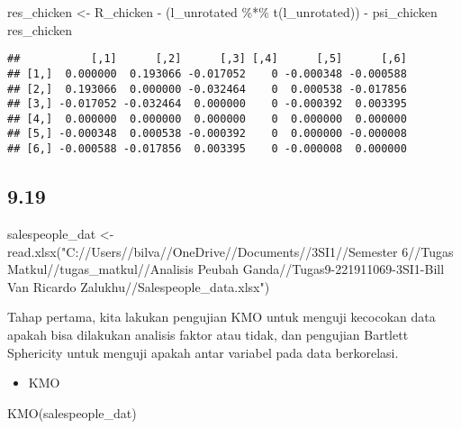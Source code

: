 \documentclass[
]{article}
\newenvironment{Shaded}{\begin{snugshade}}{\end{snugshade}}
\newcommand{\FunctionTok}[1]{\textcolor[rgb]{0.00,0.00,0.00}{#1}}
\newcommand{\NormalTok}[1]{#1}
\newcommand{\OtherTok}[1]{\textcolor[rgb]{0.56,0.35,0.01}{#1}}
\newcommand{\SpecialCharTok}[1]{\textcolor[rgb]{0.00,0.00,0.00}{#1}}
\newcommand{\StringTok}[1]{\textcolor[rgb]{0.31,0.60,0.02}{#1}}
\providecommand{\tightlist}{%
  \setlength{\itemsep}{0pt}\setlength{\parskip}{0pt}}
\begin{document}
\begin{Shaded}
\begin{Highlighting}[]
\NormalTok{res\_chicken }\OtherTok{\textless{}{-}}\NormalTok{ R\_chicken }\SpecialCharTok{{-}}\NormalTok{ (l\_unrotated }\SpecialCharTok{\%*\%} \FunctionTok{t}\NormalTok{(l\_unrotated)) }\SpecialCharTok{{-}}\NormalTok{ psi\_chicken}
\NormalTok{res\_chicken}
\end{Highlighting}
\end{Shaded}

\begin{verbatim}
##           [,1]      [,2]      [,3] [,4]      [,5]      [,6]
## [1,]  0.000000  0.193066 -0.017052    0 -0.000348 -0.000588
## [2,]  0.193066  0.000000 -0.032464    0  0.000538 -0.017856
## [3,] -0.017052 -0.032464  0.000000    0 -0.000392  0.003395
## [4,]  0.000000  0.000000  0.000000    0  0.000000  0.000000
## [5,] -0.000348  0.000538 -0.000392    0  0.000000 -0.000008
## [6,] -0.000588 -0.017856  0.003395    0 -0.000008  0.000000
\end{verbatim}

\hypertarget{section-1}{%
\subsection{9.19}\label{section-1}}

\begin{Shaded}
\begin{Highlighting}[]
\NormalTok{salespeople\_dat }\OtherTok{\textless{}{-}} \FunctionTok{read.xlsx}\NormalTok{(}\StringTok{"C://Users//bilva//OneDrive//Documents//3SI1//Semester 6//Tugas Matkul//tugas\_matkul//Analisis Peubah Ganda//Tugas9{-}221911069{-}3SI1{-}Bill Van Ricardo Zalukhu//Salespeople\_data.xlsx"}\NormalTok{)}
\end{Highlighting}
\end{Shaded}

Tahap pertama, kita lakukan pengujian KMO untuk menguji kecocokan data
apakah bisa dilakukan analisis faktor atau tidak, dan pengujian Bartlett
Sphericity untuk menguji apakah antar variabel pada data berkorelasi.

\begin{itemize}
\tightlist
\item
  KMO
\end{itemize}

\begin{Shaded}
\begin{Highlighting}[]
\FunctionTok{KMO}\NormalTok{(salespeople\_dat)}
\end{Highlighting}
\end{Shaded}
\end{document}
